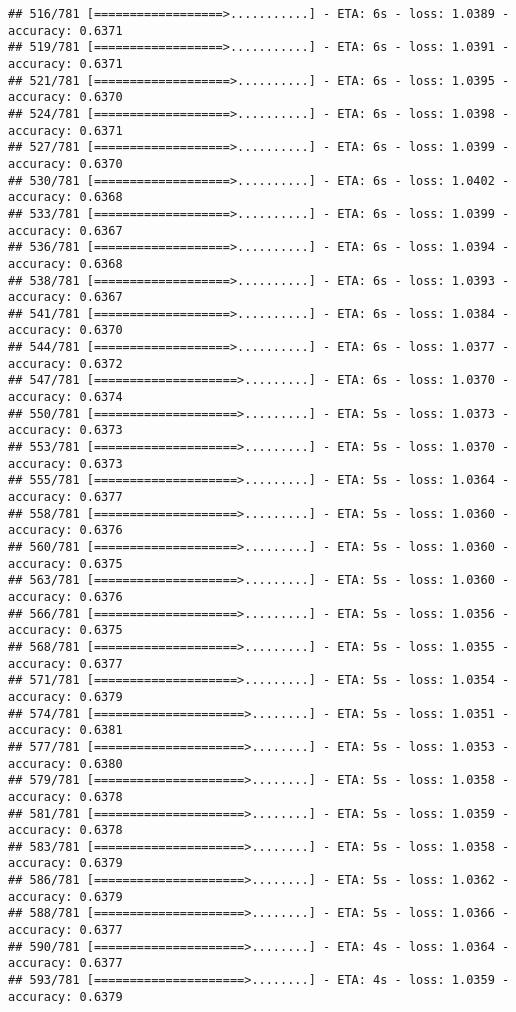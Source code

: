 \documentclass[
]{article}
\begin{document}
\begin{verbatim}
## 516/781 [==================>...........] - ETA: 6s - loss: 1.0389 - accuracy: 0.6371
## 519/781 [==================>...........] - ETA: 6s - loss: 1.0391 - accuracy: 0.6371
## 521/781 [===================>..........] - ETA: 6s - loss: 1.0395 - accuracy: 0.6370
## 524/781 [===================>..........] - ETA: 6s - loss: 1.0398 - accuracy: 0.6371
## 527/781 [===================>..........] - ETA: 6s - loss: 1.0399 - accuracy: 0.6370
## 530/781 [===================>..........] - ETA: 6s - loss: 1.0402 - accuracy: 0.6368
## 533/781 [===================>..........] - ETA: 6s - loss: 1.0399 - accuracy: 0.6367
## 536/781 [===================>..........] - ETA: 6s - loss: 1.0394 - accuracy: 0.6368
## 538/781 [===================>..........] - ETA: 6s - loss: 1.0393 - accuracy: 0.6367
## 541/781 [===================>..........] - ETA: 6s - loss: 1.0384 - accuracy: 0.6370
## 544/781 [===================>..........] - ETA: 6s - loss: 1.0377 - accuracy: 0.6372
## 547/781 [====================>.........] - ETA: 6s - loss: 1.0370 - accuracy: 0.6374
## 550/781 [====================>.........] - ETA: 5s - loss: 1.0373 - accuracy: 0.6373
## 553/781 [====================>.........] - ETA: 5s - loss: 1.0370 - accuracy: 0.6373
## 555/781 [====================>.........] - ETA: 5s - loss: 1.0364 - accuracy: 0.6377
## 558/781 [====================>.........] - ETA: 5s - loss: 1.0360 - accuracy: 0.6376
## 560/781 [====================>.........] - ETA: 5s - loss: 1.0360 - accuracy: 0.6375
## 563/781 [====================>.........] - ETA: 5s - loss: 1.0360 - accuracy: 0.6376
## 566/781 [====================>.........] - ETA: 5s - loss: 1.0356 - accuracy: 0.6375
## 568/781 [====================>.........] - ETA: 5s - loss: 1.0355 - accuracy: 0.6377
## 571/781 [====================>.........] - ETA: 5s - loss: 1.0354 - accuracy: 0.6379
## 574/781 [=====================>........] - ETA: 5s - loss: 1.0351 - accuracy: 0.6381
## 577/781 [=====================>........] - ETA: 5s - loss: 1.0353 - accuracy: 0.6380
## 579/781 [=====================>........] - ETA: 5s - loss: 1.0358 - accuracy: 0.6378
## 581/781 [=====================>........] - ETA: 5s - loss: 1.0359 - accuracy: 0.6378
## 583/781 [=====================>........] - ETA: 5s - loss: 1.0358 - accuracy: 0.6379
## 586/781 [=====================>........] - ETA: 5s - loss: 1.0362 - accuracy: 0.6379
## 588/781 [=====================>........] - ETA: 5s - loss: 1.0366 - accuracy: 0.6377
## 590/781 [=====================>........] - ETA: 4s - loss: 1.0364 - accuracy: 0.6377
## 593/781 [=====================>........] - ETA: 4s - loss: 1.0359 - accuracy: 0.6379

\end{verbatim}
\end{document}
